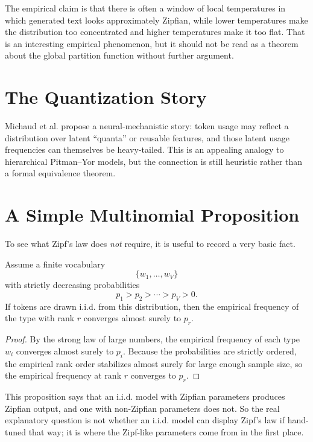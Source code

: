 The empirical claim is that there is often a window of local temperatures in which generated text looks approximately Zipfian, while lower temperatures make the distribution too concentrated and higher temperatures make it too flat. That is an interesting empirical phenomenon, but it should not be read as a theorem about the global partition function without further argument.

\section{The Quantization Story}

Michaud et al. \cite{MichaudEtAl2023} propose a neural-mechanistic story: token usage may reflect a distribution over latent ``quanta'' or reusable features, and those latent usage frequencies can themselves be heavy-tailed. This is an appealing analogy to hierarchical Pitman--Yor models, but the connection is still heuristic rather than a formal equivalence theorem.

\section{A Simple Multinomial Proposition}

To see what Zipf's law does \emph{not} require, it is useful to record a very basic fact.

\begin{proposition}
Assume a finite vocabulary
\[
  \{w_1,\dots,w_V\}
\]
with strictly decreasing probabilities
\[
  p_1 > p_2 > \cdots > p_V > 0.
\]
If tokens are drawn i.i.d. from this distribution, then the empirical frequency of the type with rank $r$ converges almost surely to $p_r$.
\end{proposition}

\begin{proof}
By the strong law of large numbers, the empirical frequency of each type $w_i$ converges almost surely to $p_i$. Because the probabilities are strictly ordered, the empirical rank order stabilizes almost surely for large enough sample size, so the empirical frequency at rank $r$ converges to $p_r$.
\end{proof}

This proposition says that an i.i.d. model with Zipfian parameters produces Zipfian output, and one with non-Zipfian parameters does not. So the real explanatory question is not whether an i.i.d. model can display Zipf's law if hand-tuned that way; it is where the Zipf-like parameters come from in the first place.

